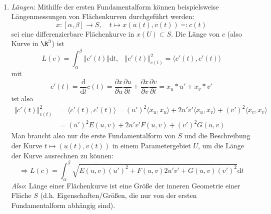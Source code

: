 \begin{remark}
 \
 \begin{enumerate}

   \item \emph{Längen}: Mithilfe der ersten Fundamentalform können beispielsweise Längenmessungen von Flächenkurven durchgeführt werden:
  \begin{equation*}
    x: [\alpha, \beta] \to S, \quad t \mapsto x(u(t), v(t)) \eqqcolon c(t)
  \end{equation*}
  sei eine differenzierbare Flächenkurve in $ x(U) \subset S $. Die Länge von $ c $ (also Kurve in $ \R^3 $) ist
  \begin{equation*}
    L(c) = \int_\alpha^\beta \Vert c'(t) \Vert \text{d}t\text{,} \quad \Vert c'(t) \Vert_{c(t)}^2 = \langle c'(t), c'(t) \rangle
  \end{equation*}
  mit
  \begin{equation*}
    c'(t) = \frac{\text{d}}{\text{d}t}c(t) = \frac{\partial x}{\partial u} \frac{\partial u}{\partial t} + \frac{\partial x}{\partial v} \frac{\partial v}{\partial t} = x_u * u' + x_v * v'
  \end{equation*}
  ist also
  \begin{align*}
    \Vert c'(t) \Vert_{c(t)}^2 &= \langle c'(t), c'(t) \rangle = (u')^2\langle x_u, x_u \rangle + 2u'v'\langle x_u, x_v \rangle + (v')^2\langle x_v, x_v \rangle \\
    &= (u')^2E(u,v) + 2u'v'F(u,v) + (v')^2G(u,v)
  \end{align*}
  Man braucht also nur die erste Fundamentalform von $ S $ und die Beschreibung der Kurve $ t \mapsto (u(t),v(t)) $ in einem Parametergebiet $ U $, um die Länge der Kurve ausrechnen zu können:
  \begin{equation*}
    \Rightarrow L(c) = \int_\alpha^\beta \sqrt{E(u,v)(u')^2 + F(u,v)2u'v' + G(u,v)(v')^2}\text{d}t
  \end{equation*}
  \emph{Also}: Länge einer Flächenkurve ist eine Größe der inneren Geometrie einer Fläche $ S $ (d.h. Eigenschaften/Größen, die nur von der ersten Fundamentalform abhängig sind).


\end{enumerate}
\end{remark}
